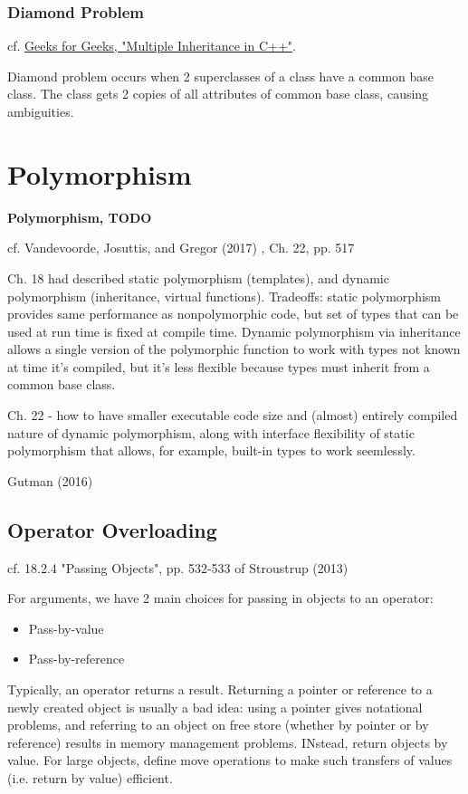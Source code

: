 \documentclass[10pt]{amsart}
\begin{document}
\begin{multicols*}{2}
\subsubsection{Diamond Problem}

cf. \href{https://www.geeksforgeeks.org/multiple-inheritance-in-c/}{Geeks for Geeks, "Multiple Inheritance in C++"}.

Diamond problem occurs when 2 superclasses of a class have a common base class. The class gets 2 copies of all attributes of common base class, causing ambiguities.

\section{Polymorphism}

\textbf{Polymorphism, TODO}

cf. Vandevoorde, Josuttis, and Gregor (2017) \cite{VJG2017}, Ch. 22, pp. 517

Ch. 18 had described static polymorphism (templates), and dynamic polymorphism (inheritance, virtual functions). Tradeoffs: static polymorphism provides same performance as nonpolymorphic code, but set of types that can be used at run time is fixed at compile time. Dynamic polymorphism via inheritance allows a single version of the polymorphic function to work with types not known at time it's compiled, but it's less flexible because types must inherit from a common base class.

Ch. 22 - how to have smaller executable code size and (almost) entirely compiled nature of dynamic polymorphism, along with interface flexibility of static polymorphism that allows, for example, built-in types to work seemlessly.

Gutman (2016) \cite{Gutt2016}

\subsection{Operator Overloading}

cf. 18.2.4 "Passing Objects", pp. 532-533 of Stroustrup (2013) \cite{Stro2013}

For arguments, we have 2 main choices for passing in objects to an operator: 
\begin{itemize}
\item Pass-by-value
\item Pass-by-reference
\end{itemize}

Typically, an operator returns a result. Returning a pointer or reference to a newly created object is usually a bad idea: using a pointer gives notational problems, and referring to an object on free store (whether by pointer or by reference) results in memory management problems. INstead, return objects by value. For large objects, define move operations to make such transfers of values (i.e. return by value) efficient.


\end{multicols*}
\end{document}
